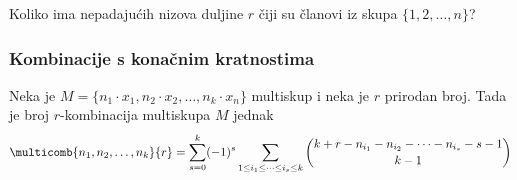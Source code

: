 \begin{problem}
    Koliko ima nepadajućih nizova duljine $r$ čiji su članovi iz skupa
    $\{1,2,\dots,n\}$?
\end{problem}

\subsubsection{Kombinacije s konačnim kratnostima}

\begin{theorem}
    Neka je $M=\{n_1 \cdot x_1, n_2 \cdot x_2, \dots, n_k \cdot x_n\}$
    multiskup i neka je $r$ prirodan broj. Tada je broj $r$-kombinacija
    multiskupa $M$ jednak
    $$
        \multicomb{n_1,n_2,\dots,n_k}{r} = \sum_{s=0}^{k} (-1)^s \sum_{1 \leq i_1 \leq \dots \leq i_s \leq k} \binom{k+r-n_{i_1}-n_{i_2}-\dots-n_{i_s}-s-1}{k-1}
    $$
\end{theorem}

